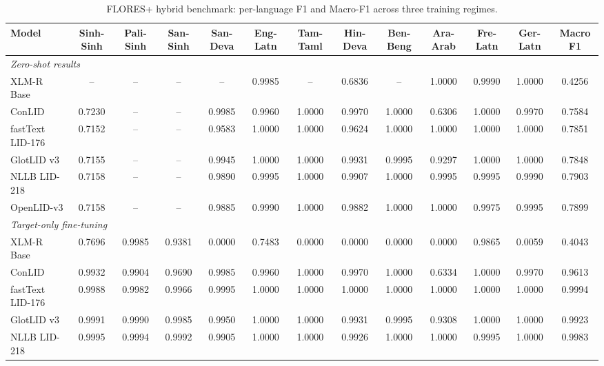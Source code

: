 \begin{table}[p]
\centering
\scriptsize
\setlength{\tabcolsep}{1.4pt}
\renewcommand{\arraystretch}{0.78}
\caption{FLORES+ hybrid benchmark: per-language F1 and Macro-F1 across three training regimes.}
\label{tab:flores_full}
\begin{tabular}{l ccc cccccccc c}
\toprule
\textbf{Model} & \textbf{Sinh-Sinh} & \textbf{Pali-Sinh} & \textbf{San-Sinh} & \textbf{San-Deva} & \textbf{Eng-Latn} & \textbf{Tam-Taml} & \textbf{Hin-Deva} & \textbf{Ben-Beng} & \textbf{Ara-Arab} & \textbf{Fre-Latn} & \textbf{Ger-Latn} & \textbf{Macro F1} \\
\midrule
\multicolumn{13}{l}{\textit{Zero-shot results}} \\
XLM-R Base & -- & -- & -- & -- & 0.9985 & -- & 0.6836 & -- & 1.0000 & 0.9990 & 1.0000 & 0.4256 \\
ConLID & 0.7230 & -- & -- & 0.9985 & 0.9960 & 1.0000 & 0.9970 & 1.0000 & 0.6306 & 1.0000 & 0.9970 & 0.7584 \\
fastText LID-176 & 0.7152 & -- & -- & 0.9583 & 1.0000 & 1.0000 & 0.9624 & 1.0000 & 1.0000 & 1.0000 & 1.0000 & 0.7851 \\
GlotLID v3 & 0.7155 & -- & -- & 0.9945 & 1.0000 & 1.0000 & 0.9931 & 0.9995 & 0.9297 & 1.0000 & 1.0000 & 0.7848 \\
NLLB LID-218 & 0.7158 & -- & -- & 0.9890 & 0.9995 & 1.0000 & 0.9907 & 1.0000 & 0.9995 & 0.9995 & 0.9990 & 0.7903 \\
OpenLID-v3 & 0.7158 & -- & -- & 0.9885 & 0.9990 & 1.0000 & 0.9882 & 1.0000 & 1.0000 & 0.9975 & 0.9995 & 0.7899 \\
\midrule
\multicolumn{13}{l}{\textit{Target-only fine-tuning}} \\
XLM-R Base & 0.7696 & 0.9985 & 0.9381 & 0.0000 & 0.7483 & 0.0000 & 0.0000 & 0.0000 & 0.0000 & 0.9865 & 0.0059 & 0.4043 \\
ConLID & 0.9932 & 0.9904 & 0.9690 & 0.9985 & 0.9960 & 1.0000 & 0.9970 & 1.0000 & 0.6334 & 1.0000 & 0.9970 & 0.9613 \\
fastText LID-176 & 0.9988 & 0.9982 & 0.9966 & 0.9995 & 1.0000 & 1.0000 & 1.0000 & 1.0000 & 1.0000 & 1.0000 & 1.0000 & 0.9994 \\
GlotLID v3 & 0.9991 & 0.9990 & 0.9985 & 0.9950 & 1.0000 & 1.0000 & 0.9931 & 0.9995 & 0.9308 & 1.0000 & 1.0000 & 0.9923 \\
NLLB LID-218 & 0.9995 & 0.9994 & 0.9992 & 0.9905 & 1.0000 & 1.0000 & 0.9926 & 1.0000 & 1.0000 & 0.9995 & 1.0000 & 0.9983 \\

\end{tabular}
\end{table}
